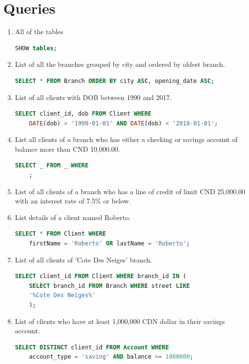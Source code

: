 \documentclass[letterpaper, 12pt]{article}
\begin{document}
\newpage
\section{Queries}

\begin{enumerate}[label=\arabic*.]
  \item All of the tables
    \begin{lstlisting}[language=sql]
SHOW tables;
  \end{lstlisting}
  \item List of all the branches grouped by city and ordered by oldest branch.
    \begin{lstlisting}[language=sql]
SELECT * FROM Branch ORDER BY city ASC, opening_date ASC;
  \end{lstlisting}
  \item List of all clients with DOB between 1990 and 2017.
    \begin{lstlisting}[language=sql]
SELECT client_id, dob FROM Client WHERE 
	DATE(dob) > '1990-01-01' AND DATE(dob) < '2018-01-01';
  \end{lstlisting}
  \item List all clients of a branch who has either a checking or savings account of balance more than CND 10,000.00.
    \begin{lstlisting}[language=sql]
SELECT _ FROM _ WHERE 
	;
  \end{lstlisting}
  \item List of all clients of a branch who has a line of credit of limit CND 25,000.00 with an interest rate of 7.5\% or below.
  \item List details of a client named Roberto.
    \begin{lstlisting}[language=sql]
SELECT * FROM Client WHERE 
	firstName = 'Roberto' OR lastName = 'Roberto';
  \end{lstlisting}
  \item List of all clients of 'Cote Des Neiges' branch.
    \begin{lstlisting}[language=sql]
SELECT client_id FROM Client WHERE branch_id IN (
	SELECT branch_id FROM Branch WHERE street LIKE
	'%Cote Des Neiges%'
    );
  \end{lstlisting}
  \item List of clients who have at least 1,000,000 CDN dollar in their savings account.
    \begin{lstlisting}[language=sql]
SELECT DISTINCT client_id FROM Account WHERE 
	account_type = 'saving' AND balance >= 1000000;

\end{lstlisting}
\end{enumerate}
\end{document}
